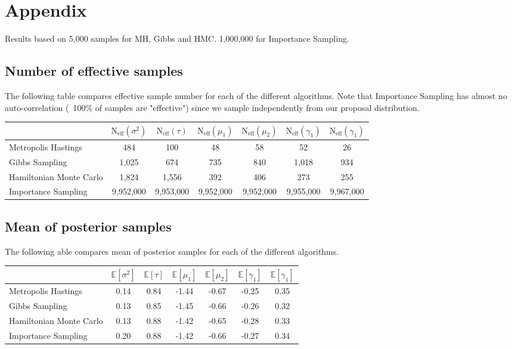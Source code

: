 \documentclass[12pt,letterpaper,twoside]{article}
\begin{document}
\newpage
\section{Appendix}
Results based on 5,000 samples for MH, Gibbs and HMC. 1,000,000 for Importance Sampling.
\subsection{Number of effective samples}
The following table compares effective sample number for each of the different algorithms. 
Note that Importance Sampling has almost no auto-correlation (~100\% of samples are "effective") 
since we sample independently from our proposal distribution. 
\begin{table}[H]
    \begin{tabular}{lcccccc}
    \hline
    \multicolumn{1}{c}{}         & $\text{N}_{\text{eff}}(\sigma^2)$ & $\text{N}_{\text{eff}}(\tau)$   & $\text{N}_{\text{eff}}(\mu_1)$   & $\text{N}_{\text{eff}}(\mu_2)$   & $\text{N}_{\text{eff}}(\gamma_1)$  & $\text{N}_{\text{eff}}(\gamma_1)$  \\
    \hline
    Metropolis Hastings          & 484   & 100   & 48    & 58    & 52    & 26    \\
    Gibbs Sampling               & 1,025 & 674   & 735   & 840   & 1,018 & 934   \\
    Hamiltonian Monte Carlo      & 1,824 & 1,556 & 392   & 406   & 273   & 255    \\  
    Importance Sampling          & 9,952,000 & 9,953,000 & 9,952,000 & 9,952,000 & 9,955,000 & 9,967,000  \\
    \hline
    \end{tabular}
\end{table}

\subsection{Mean of posterior samples}
The following able compares mean of posterior samples for each of the different algorithms.
\begin{table}[H]
    \begin{tabular}{lcccccc}
    \hline
    \multicolumn{1}{c}{}         & $\mathbb{E}[\sigma^2]$ \quad & $\mathbb{E}[\tau]$ \quad   & $\mathbb{E}[\mu_1]$  \quad  & $\mathbb{E}[\mu_2]$  \quad  & $\mathbb{E}[\gamma_1]$ \quad  & $\mathbb{E}[\gamma_1]$  \\
    \hline
    Metropolis Hastings          & 0.14  & 0.84  & -1.44 & -0.67 & -0.25 & 0.35  \\
    Gibbs Sampling               & 0.13  & 0.85  & -1.45 & -0.66 & -0.26 & 0.32  \\
    Hamiltonian Monte Carlo      & 0.13  & 0.88  & -1.42 & -0.65 & -0.28 & 0.33  \\  
    Importance Sampling          & 0.20  & 0.88  & -1.42 & -0.66 & -0.27 & 0.34  \\
    \hline
    \end{tabular}
\end{table}
\end{document}
